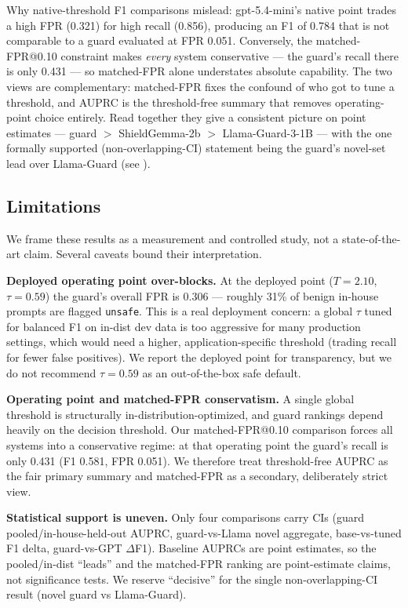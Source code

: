 \documentclass[sigconf,nonacm]{acmart}
\begin{document}
Why native-threshold F1 comparisons mislead: gpt-5.4-mini's native point trades a high FPR (0.321) for high recall (0.856), producing an F1 of 0.784 that is not comparable to a guard evaluated at FPR 0.051. Conversely, the matched-FPR@0.10 constraint makes \emph{every} system conservative --- the guard's recall there is only 0.431 --- so matched-FPR alone understates absolute capability. The two views are complementary: matched-FPR fixes the confound of who got to tune a threshold, and AUPRC is the threshold-free summary that removes operating-point choice entirely. Read together they give a consistent picture on point estimates --- guard $>$ ShieldGemma-2b $>$ Llama-Guard-3-1B --- with the one formally supported (non-overlapping-CI) statement being the guard's novel-set lead over Llama-Guard (see ).

\subsection{Limitations}
\label{sec:limitations}

We frame these results as a measurement and controlled study, not a state-of-the-art claim. Several caveats bound their interpretation.

\textbf{Deployed operating point over-blocks.} At the deployed point ($T=2.10$, $\tau=0.59$) the guard's overall FPR is 0.306 --- roughly 31\% of benign in-house prompts are flagged \texttt{unsafe}. This is a real deployment concern: a global $\tau$ tuned for balanced F1 on in-dist dev data is too aggressive for many production settings, which would need a higher, application-specific threshold (trading recall for fewer false positives). We report the deployed point for transparency, but we do not recommend $\tau=0.59$ as an out-of-the-box safe default.

\textbf{Operating point and matched-FPR conservatism.} A single global threshold is structurally in-distribution-optimized, and guard rankings depend heavily on the decision threshold. Our matched-FPR@0.10 comparison forces all systems into a conservative regime: at that operating point the guard's recall is only 0.431 (F1 0.581, FPR 0.051). We therefore treat threshold-free AUPRC as the fair primary summary and matched-FPR as a secondary, deliberately strict view.

\textbf{Statistical support is uneven.} Only four comparisons carry CIs (guard pooled/in-house-held-out AUPRC, guard-vs-Llama novel aggregate, base-vs-tuned F1 delta, guard-vs-GPT $\Delta$F1). Baseline AUPRCs are point estimates, so the pooled/in-dist ``leads'' and the matched-FPR ranking are point-estimate claims, not significance tests. We reserve ``decisive'' for the single non-overlapping-CI result (novel guard vs Llama-Guard).
\end{document}
